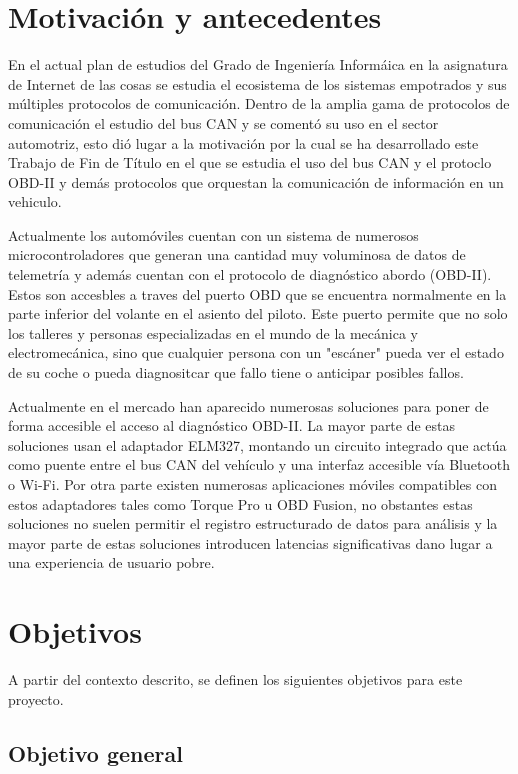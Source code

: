 \section{Motivación y antecedentes}

En el actual plan de estudios del Grado de Ingeniería Informáica en la asignatura de Internet de las cosas se estudia el ecosistema de los sistemas empotrados y sus múltiples protocolos de comunicación. Dentro de la amplia gama de protocolos de comunicación el estudio del bus CAN y se comentó su uso en el sector automotriz, esto dió lugar a la motivación por la cual se ha desarrollado este Trabajo de Fin de Título en el que se estudia el uso del bus CAN y el protoclo OBD-II y demás protocolos que orquestan la comunicación de información en un vehiculo.

Actualmente los automóviles cuentan con un sistema de numerosos microcontroladores que generan una cantidad muy voluminosa de datos de telemetría y además cuentan con el protocolo de diagnóstico abordo (OBD-II). Estos son accesbles a traves del puerto OBD que se encuentra normalmente en la parte inferior del volante en el asiento del piloto. Este puerto permite que no solo los talleres y personas especializadas en el mundo de la mecánica y electromecánica, sino que cualquier persona con un "escáner" pueda ver el estado de su coche o pueda diagnositcar que fallo tiene o anticipar posibles fallos.

Actualmente en el mercado han aparecido numerosas soluciones para poner de forma accesible el acceso al diagnóstico OBD-II. La mayor parte de estas soluciones usan el adaptador ELM327, montando un circuito integrado que actúa como puente entre el bus CAN del vehículo y una interfaz accesible vía Bluetooth o Wi-Fi. Por otra parte existen numerosas aplicaciones móviles compatibles con estos adaptadores tales como Torque Pro u OBD Fusion, no obstantes estas soluciones no suelen permitir el registro estructurado de datos para análisis y la mayor parte de estas soluciones introducen latencias significativas dano lugar a una experiencia de usuario pobre.

\section{Objetivos}
\label{sec:objetivos}

A partir del contexto descrito, se definen los siguientes objetivos para este proyecto.

\subsection{Objetivo general}

